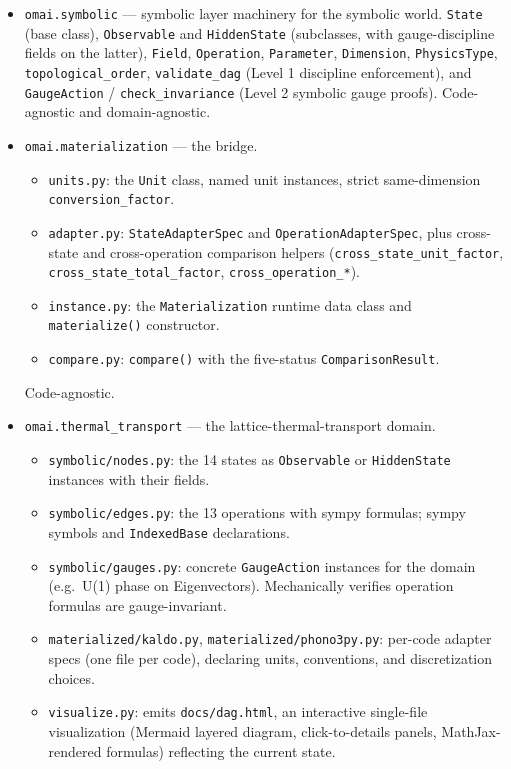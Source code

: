 \documentclass[11pt,a4paper]{article}
\begin{document}
\begin{itemize}[leftmargin=2em, itemsep=0.3em]
  \item \texttt{omai.symbolic} --- symbolic layer machinery for the symbolic world.
        \texttt{State} (base class), \texttt{Observable} and \texttt{HiddenState}
        (subclasses, with gauge-discipline fields on the latter), \texttt{Field},
        \texttt{Operation}, \texttt{Parameter}, \texttt{Dimension},
        \texttt{PhysicsType}, \texttt{topological\_order},
        \texttt{validate\_dag} (Level 1 discipline enforcement), and
        \texttt{GaugeAction} / \texttt{check\_invariance} (Level 2 symbolic
        gauge proofs). Code-agnostic and domain-agnostic.
  \item \texttt{omai.materialization} --- the bridge.
    \begin{itemize}[leftmargin=1.2em]
      \item \texttt{units.py}: the \texttt{Unit} class, named unit instances, strict
            same-dimension \texttt{conversion\_factor}.
      \item \texttt{adapter.py}: \texttt{StateAdapterSpec} and
            \texttt{OperationAdapterSpec}, plus cross-state and cross-operation
            comparison helpers (\texttt{cross\_state\_unit\_factor},
            \texttt{cross\_state\_total\_factor}, \texttt{cross\_operation\_*}).
      \item \texttt{instance.py}: the \texttt{Materialization} runtime data class
            and \texttt{materialize()} constructor.
      \item \texttt{compare.py}: \texttt{compare()} with the five-status
            \texttt{ComparisonResult}.
    \end{itemize}
    Code-agnostic.
  \item \texttt{omai.thermal\_transport} --- the lattice-thermal-transport domain.
    \begin{itemize}[leftmargin=1.2em]
      \item \texttt{symbolic/nodes.py}: the 14 states as \texttt{Observable} or
            \texttt{HiddenState} instances with their fields.
      \item \texttt{symbolic/edges.py}: the 13 operations with sympy formulas;
            sympy symbols and \texttt{IndexedBase} declarations.
      \item \texttt{symbolic/gauges.py}: concrete \texttt{GaugeAction}
            instances for the domain (e.g.\ U(1) phase on Eigenvectors).
            Mechanically verifies operation formulas are gauge-invariant.
      \item \texttt{materialized/kaldo.py}, \texttt{materialized/phono3py.py}:
            per-code adapter specs (one file per code), declaring units,
            conventions, and discretization choices.
      \item \texttt{visualize.py}: emits \texttt{docs/dag.html}, an interactive
            single-file visualization (Mermaid layered diagram, click-to-details
            panels, MathJax-rendered formulas) reflecting the current state.
    \end{itemize}
\end{itemize}
\end{document}
